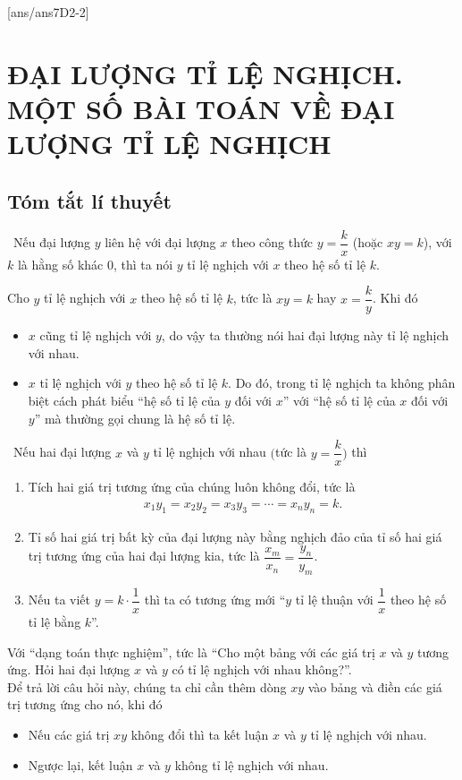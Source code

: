 [ans/ans7D2-2]
\section{ĐẠI LƯỢNG TỈ LỆ NGHỊCH. MỘT SỐ BÀI TOÁN VỀ ĐẠI LƯỢNG TỈ LỆ NGHỊCH}
\subsection{Tóm tắt lí thuyết}
\tickEX \ Nếu đại lượng $y$ liên hệ với đại lượng $x$ theo công thức $y=\dfrac{k}{x}$ (hoặc $xy=k$), với $k$ là hằng số khác $0$, thì ta nói $y$ tỉ lệ nghịch với $x$ theo hệ số tỉ lệ $k$.
\begin{note}
	Cho $y$ tỉ lệ nghịch với $x$ theo hệ số tỉ lệ $k$, tức là $xy=k$ hay $x=\dfrac{k}{y}$. Khi đó
	\begin{itemize}
		\item $x$ cũng tỉ lệ nghịch với $y$, do vậy ta thường nói hai đại lượng này tỉ lệ nghịch với nhau.
		\item $x$ tỉ lệ nghịch với $y$ theo hệ số tỉ lệ $k$. Do đó, trong tỉ lệ nghịch ta không phân biệt cách phát biểu ``hệ số tỉ lệ của $y$ đối với $x$'' với ``hệ số tỉ lệ của $x$ đối với $y$'' mà thường gọi chung là hệ số tỉ lệ.
	\end{itemize}
\end{note}
\tickEX \, Nếu hai đại lượng $x$ và $y$ tỉ lệ nghịch với nhau $\bigg($tức là $y=\dfrac{k}{x}\bigg)$ thì
\begin{enumerate}
	\item Tích hai giá trị tương ứng của chúng luôn không đổi, tức là
	\begin{eqnarray*}
		x_1y_1 = x_2y_2 = x_3y_3 = \cdots = x_ny_n = k.
	\end{eqnarray*}
	\item Tỉ số hai giá trị bất kỳ của đại lượng này bằng nghịch đảo của tỉ số hai giá trị tương ứng của hai đại lượng kia, tức là $\dfrac{x_m}{x_n} = \dfrac{y_n}{y_m}$.
	\item Nếu ta viết $y=k\cdot\dfrac{1}{x}$ thì ta có tương ứng mới ``$y$ tỉ lệ thuận với $\dfrac{1}{x}$ theo hệ số tỉ lệ bằng $k$''.
\end{enumerate}

\begin{note}
	Với ``dạng toán thực nghiệm'', tức là ``Cho một bảng với các giá trị $x$ và $y$ tương ứng. Hỏi hai đại lượng $x$ và $y$ có tỉ lệ nghịch với nhau không?''.\\
	Để trả lời câu hỏi này, chúng ta chỉ cần thêm dòng $xy$ vào bảng và điền các giá trị tương ứng cho nó, khi đó
	\begin{itemize}
		\item Nếu các giá trị $xy$ không đổi thì ta kết luận $x$ và $y$ tỉ lệ nghịch với nhau.
		\item Ngược lại, kết luận $x$ và $y$ không tỉ lệ nghịch với nhau.
	\end{itemize}
\end{note}
